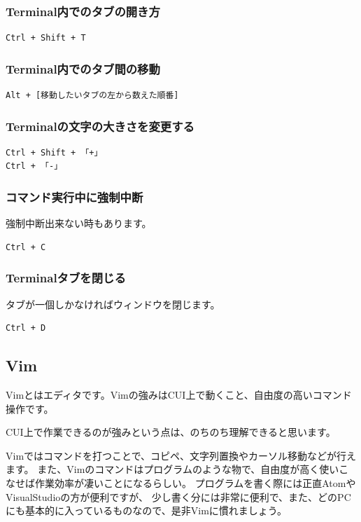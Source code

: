 \documentclass[11pt,a4paper]{jsarticle}
\begin{document}
\subsubsection{Terminal内でのタブの開き方}
\begin{lstlisting}[frame=single]
Ctrl + Shift + T
\end{lstlisting}

\subsubsection{Terminal内でのタブ間の移動}
\begin{lstlisting}[frame=single]
Alt + [移動したいタブの左から数えた順番]
\end{lstlisting}

\subsubsection{Terminalの文字の大きさを変更する}
\begin{lstlisting}[frame=single]
Ctrl + Shift + 「+」
Ctrl + 「-」
\end{lstlisting}

\subsubsection{コマンド実行中に強制中断}
強制中断出来ない時もあります。
\begin{lstlisting}[frame=single]
Ctrl + C
\end{lstlisting}

\subsubsection{Terminalタブを閉じる}
タブが一個しかなければウィンドウを閉じます。
\begin{lstlisting}[frame=single]
Ctrl + D
\end{lstlisting}


\newpage

\subsection{Vim}
Vimとはエディタです。Vimの強みはCUI上で動くこと、自由度の高いコマンド操作です。

CUI上で作業できるのが強みという点は、のちのち理解できると思います。

Vimではコマンドを打つことで、コピペ、文字列置換やカーソル移動などが行えます。
また、Vimのコマンドはプログラムのような物で、自由度が高く使いこなせば作業効率が凄いことになるらしい。
プログラムを書く際には正直AtomやVisualStudioの方が便利ですが、
少し書く分には非常に便利で、また、どのPCにも基本的に入っているものなので、是非Vimに慣れましょう。
\end{document}
